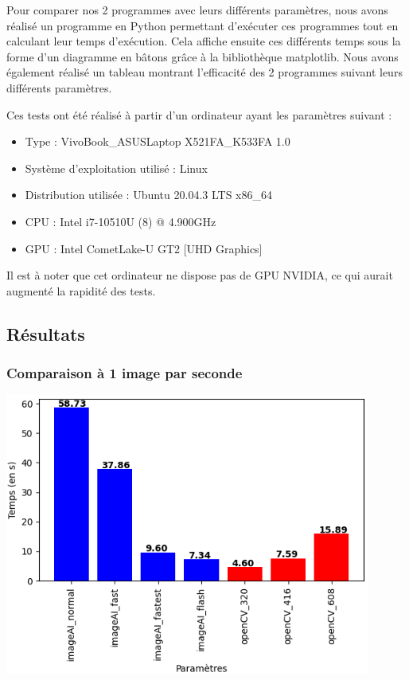 Pour comparer nos 2 programmes avec leurs différents paramètres, nous avons réalisé un programme en Python permettant
d'exécuter ces programmes tout en calculant leur temps d'exécution.
Cela affiche ensuite ces différents temps sous la forme d'un diagramme en bâtons grâce à la bibliothèque matplotlib.
Nous avons également réalisé un tableau montrant l'efficacité des 2 programmes suivant leurs différents paramètres.

Ces tests ont été réalisé à partir d'un ordinateur ayant les paramètres suivant :
\begin{itemize}
    \item Type : VivoBook\_ASUSLaptop X521FA\_K533FA 1.0
    \item Système d'exploitation utilisé : Linux
    \item Distribution utilisée : Ubuntu 20.04.3 LTS x86\_64
    \item \gls{CPU} : Intel i7-10510U (8) @ 4.900GHz
    \item \gls{GPU} : Intel CometLake-U GT2 [UHD Graphics]
\end{itemize}
Il est à noter que cet ordinateur ne dispose pas de GPU NVIDIA, ce qui aurait augmenté la rapidité des tests.

\subsection{Résultats}
\label{sec:comparaisonIA:resultats}

\subsubsection{Comparaison à 1 image par seconde}
\label{sec:comparaisonIA:resultats:1fps}

\begin{center}
    \centering
    \includegraphics[width=0.9\textwidth]{img/result_1fps.png}
\end{center}

